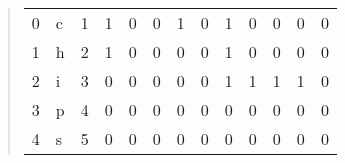 \begin{quote}
\begin{table}[H]
\begin{tabular}{lllllllllllll}
          0 & c & \multicolumn{1}{l|}{1} & \multicolumn{1}{l|}{\cellcolor[HTML]{FFFFFF}1} & \multicolumn{1}{l|}{\cellcolor[HTML]{FFFFFF}0} & \multicolumn{1}{l|}{\cellcolor[HTML]{FFFFFF}0} & \multicolumn{1}{l|}{\cellcolor[HTML]{FFFFFF}1} & \multicolumn{1}{l|}{\cellcolor[HTML]{FFFFFF}0} & \multicolumn{1}{l|}{\cellcolor[HTML]{FFFFFF}1} & \multicolumn{1}{l|}{\cellcolor[HTML]{FFFFFF}0} & \multicolumn{1}{l|}{\cellcolor[HTML]{FFFFFF}0} & \multicolumn{1}{l|}{\cellcolor[HTML]{FFFFFF}0} & \multicolumn{1}{l|}{\cellcolor[HTML]{FFFFFF}0} \\ \cline{4-13} 
          1 & h & \multicolumn{1}{l|}{2} & \multicolumn{1}{l|}{\cellcolor[HTML]{FFFFFF}1} & \multicolumn{1}{l|}{\cellcolor[HTML]{FFFFFF}0} & \multicolumn{1}{l|}{\cellcolor[HTML]{FFFFFF}0} & \multicolumn{1}{l|}{\cellcolor[HTML]{FFFFFF}0} & \multicolumn{1}{l|}{\cellcolor[HTML]{FFFFFF}0} & \multicolumn{1}{l|}{\cellcolor[HTML]{FFFFFF}1} & \multicolumn{1}{l|}{\cellcolor[HTML]{FFFFFF}0} & \multicolumn{1}{l|}{\cellcolor[HTML]{FFFFFF}0} & \multicolumn{1}{l|}{\cellcolor[HTML]{FFFFFF}0} & \multicolumn{1}{l|}{\cellcolor[HTML]{FFFFFF}0} \\ \cline{4-13} 
          2 & i & \multicolumn{1}{l|}{3} & \multicolumn{1}{l|}{\cellcolor[HTML]{FFFFFF}0} & \multicolumn{1}{l|}{\cellcolor[HTML]{FFFFFF}0} & \multicolumn{1}{l|}{\cellcolor[HTML]{FFFFFF}0} & \multicolumn{1}{l|}{\cellcolor[HTML]{FFFFFF}0} & \multicolumn{1}{l|}{\cellcolor[HTML]{FFFFFF}0} & \multicolumn{1}{l|}{\cellcolor[HTML]{FFFFFF}1} & \multicolumn{1}{l|}{\cellcolor[HTML]{FFFFFF}1} & \multicolumn{1}{l|}{\cellcolor[HTML]{FFFFFF}1} & \multicolumn{1}{l|}{\cellcolor[HTML]{FFFFFF}1} & \multicolumn{1}{l|}{\cellcolor[HTML]{FFFFFF}0} \\ \cline{4-13} 
          3 & p & \multicolumn{1}{l|}{4} & \multicolumn{1}{l|}{\cellcolor[HTML]{FFFFFF}0} & \multicolumn{1}{l|}{\cellcolor[HTML]{FFFFFF}0} & \multicolumn{1}{l|}{\cellcolor[HTML]{FFFFFF}0} & \multicolumn{1}{l|}{\cellcolor[HTML]{FFFFFF}0} & \multicolumn{1}{l|}{\cellcolor[HTML]{FFFFFF}0} & \multicolumn{1}{l|}{\cellcolor[HTML]{FFFFFF}0} & \multicolumn{1}{l|}{\cellcolor[HTML]{FFFFFF}0} & \multicolumn{1}{l|}{\cellcolor[HTML]{FFFFFF}0} & \multicolumn{1}{l|}{\cellcolor[HTML]{FFFFFF}0} & \multicolumn{1}{l|}{\cellcolor[HTML]{FFFFFF}0} \\ \cline{4-13} 
          4 & s & \multicolumn{1}{l|}{5} & \multicolumn{1}{l|}{\cellcolor[HTML]{FFFFFF}0} & \multicolumn{1}{l|}{\cellcolor[HTML]{FFFFFF}0} & \multicolumn{1}{l|}{\cellcolor[HTML]{FFFFFF}0} & \multicolumn{1}{l|}{\cellcolor[HTML]{FFFFFF}0} & \multicolumn{1}{l|}{\cellcolor[HTML]{FFFFFF}0} & \multicolumn{1}{l|}{\cellcolor[HTML]{FFFFFF}0} & \multicolumn{1}{l|}{\cellcolor[HTML]{FFFFFF}0} & \multicolumn{1}{l|}{\cellcolor[HTML]{FFFFFF}0} & \multicolumn{1}{l|}{\cellcolor[HTML]{FFFFFF}0} & \multicolumn{1}{l|}{\cellcolor[HTML]{FFFFFF}0} \\ \cline{4-13} 
          \end{tabular}
    \end{table}


\end{quote}
